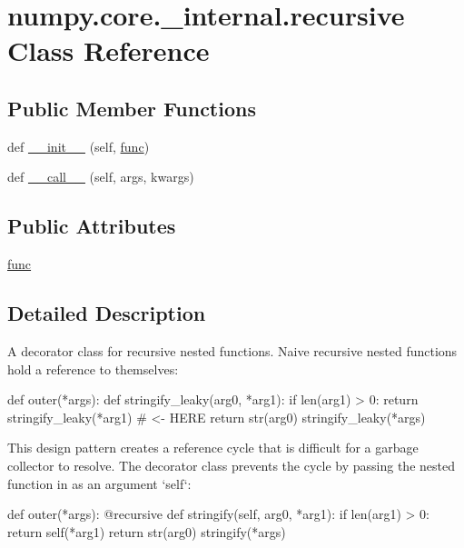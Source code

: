\hypertarget{classnumpy_1_1core_1_1__internal_1_1recursive}{}\section{numpy.\+core.\+\_\+internal.\+recursive Class Reference}
\label{classnumpy_1_1core_1_1__internal_1_1recursive}
\subsection*{Public Member Functions}
\begin{DoxyCompactItemize}
\item 
def \hyperlink{classnumpy_1_1core_1_1__internal_1_1recursive_a84ef575adb57f38c8a5d5e56b2feea35}{\+\_\+\+\_\+init\+\_\+\+\_\+} (self, \hyperlink{classnumpy_1_1core_1_1__internal_1_1recursive_a54dcb8bc12265c15f94bbc3daa29cf21}{func})
\item 
def \hyperlink{classnumpy_1_1core_1_1__internal_1_1recursive_ad6575004996debbe671ae414474b65eb}{\+\_\+\+\_\+call\+\_\+\+\_\+} (self, args, kwargs)
\end{DoxyCompactItemize}
\subsection*{Public Attributes}
\begin{DoxyCompactItemize}
\item 
\hyperlink{classnumpy_1_1core_1_1__internal_1_1recursive_a54dcb8bc12265c15f94bbc3daa29cf21}{func}
\end{DoxyCompactItemize}


\subsection{Detailed Description}
\begin{DoxyVerb}A decorator class for recursive nested functions.
Naive recursive nested functions hold a reference to themselves:

def outer(*args):
    def stringify_leaky(arg0, *arg1):
        if len(arg1) > 0:
            return stringify_leaky(*arg1)  # <- HERE
        return str(arg0)
    stringify_leaky(*args)

This design pattern creates a reference cycle that is difficult for a
garbage collector to resolve. The decorator class prevents the
cycle by passing the nested function in as an argument `self`:

def outer(*args):
    @recursive
    def stringify(self, arg0, *arg1):
        if len(arg1) > 0:
            return self(*arg1)
        return str(arg0)
    stringify(*args)\end{DoxyVerb}
 


